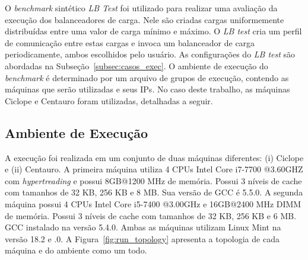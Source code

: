 O \textit{benchmark} sintético \textit{LB Test} foi utilizado para realizar uma avaliação da execução dos balanceadores de carga.
Nele são criadas cargas uniformemente distribuídas entre uma valor de carga mínimo e máximo. 
O \textit{LB test} cria um perfil de comunicação entre estas cargas e invoca um balanceador de carga periodicamente, ambos escolhidos pelo usuário.
As configurações do \textit{LB test} são abordadas na Subseção~\ref{subsec:casos_exec}.
O ambiente de execução do \textit{benchmark }é determinado por um arquivo de grupos de execução, contendo as máquinas que serão utilizadas e seus IPs.
No caso deste trabalho, as máquinas Ciclope e Centauro foram utilizadas, detalhadas a seguir.

\subsection{Ambiente de Execução}
\label{subsec:ambiente}


A execução foi realizada em um conjunto de duas máquinas diferentes: (i) Ciclope e (ii) Centauro.
A primeira máquina utiliza 4 CPUs Intel Core i7-7700 @3.60GHZ com \textit{hypertreading} e possui 8GB@1200 MHz de memória. Possui 3 níveis de cache com tamanhos de 32 KB, 256 KB e 8 MB.
Sua versão de GCC é 5.5.0.
A segunda máquina possui 4 CPUs Intel Core i5-7400 @3.00GHz e 16GB@2400 MHz DIMM de memória. Possui 3 níveis de cache com tamanhos de 32 KB, 256 KB e 6 MB. GCC instalado na versão 5.4.0.
Ambas as máquinas utilizam Linux Mint na versão 18.2 e .0.
A Figura~\ref{fig:run_topology} apresenta a topologia de cada máquina e do ambiente como um todo. 


